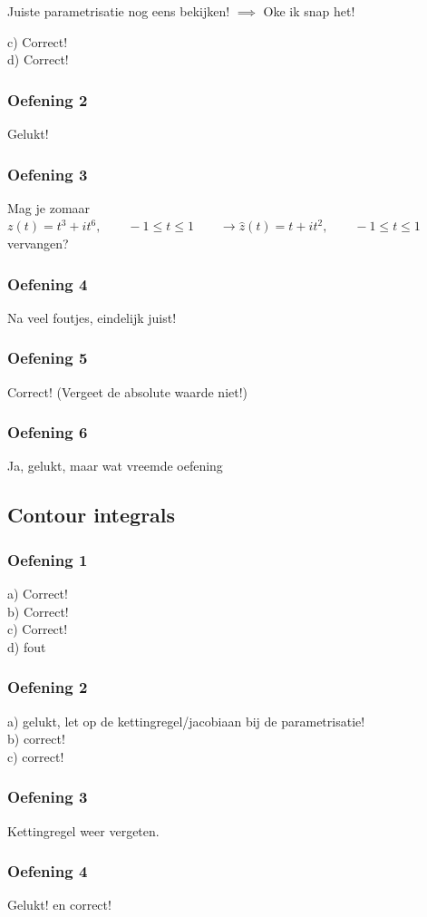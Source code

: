 \documentclass[a4paper,twoside]{article}
\theoremstyle{definition}
\theoremstyle{plain}
\begin{document}
Juiste parametrisatie nog eens bekijken!
\(\implies\) Oke ik snap het!

c) Correct! \\
d) Correct!
\subsubsection{Oefening 2}
Gelukt!
\subsubsection{Oefening 3}
Mag je zomaar \(z(t)= t^3 + i t^6, \qquad -1\leq t\leq 1 \qquad \to \hat{z}(t) = t + i t^2, \qquad -1\leq t\leq 1\) vervangen?
\subsubsection{Oefening 4}
Na veel foutjes, eindelijk juist!
\subsubsection{Oefening 5}
Correct! (Vergeet de absolute waarde niet!)
\subsubsection{Oefening 6}
Ja, gelukt, maar wat vreemde oefening
\subsection{Contour integrals}
\subsubsection{Oefening 1}
a) Correct! \\
b) Correct! \\
c) Correct! \\
d) fout
\subsubsection{Oefening 2}
a) gelukt, let op de kettingregel/jacobiaan bij de parametrisatie! \\
b) correct! \\
c) correct! \\
\subsubsection{Oefening 3}
Kettingregel weer vergeten.

\subsubsection{Oefening 4}
Gelukt! en correct!
\end{document}
